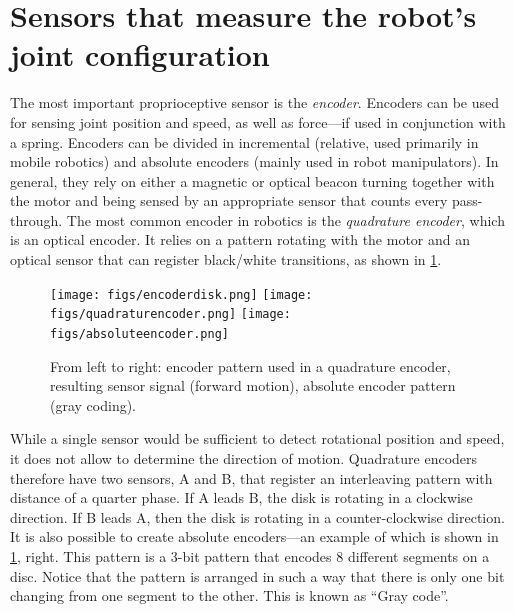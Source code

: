 
\section{Sensors that measure the robot's joint configuration}\label{sec:sensors:encoders}

The most important proprioceptive sensor is the \textsl{encoder}. Encoders can be used for sensing joint position and speed, as well as force---if used in conjunction with a spring. Encoders can be divided in incremental (relative, used primarily in mobile robotics) and absolute encoders (mainly used in robot manipulators).
In general, they rely on either a magnetic or optical beacon turning together with the motor and being sensed by an appropriate sensor that counts every pass-through. The most common encoder in robotics is the \textsl{quadrature encoder}, which is an optical encoder. It relies on a pattern rotating with the motor and an optical sensor that can register black/white transitions, as shown in \cref{fig:encoders}.

\begin{figure}
	\centering
		\texttt{[image: figs/encoderdisk.png]}
		\texttt{[image: figs/quadraturencoder.png]}
		\texttt{[image: figs/absoluteencoder.png]}
	\caption{From left to right: encoder pattern used in a quadrature encoder, resulting sensor signal (forward motion), absolute encoder pattern (gray coding).}
	\label{fig:encoders}
\end{figure}

While a single sensor would be sufficient to detect rotational position and speed, it does not allow to determine the direction of motion. Quadrature encoders therefore have two sensors, A and B, that register an interleaving pattern with distance of a quarter phase. If A leads B, the disk is rotating in a clockwise direction. If B leads A, then the disk is rotating in a counter-clockwise direction. It is also possible to create absolute encoders---an example of which is shown in \cref{fig:encoders}, right. This pattern is a 3-bit pattern that encodes 8 different segments on a disc. Notice that the pattern is arranged in such a way that there is only one bit changing from one segment to the other. This is known as ``Gray code''.

